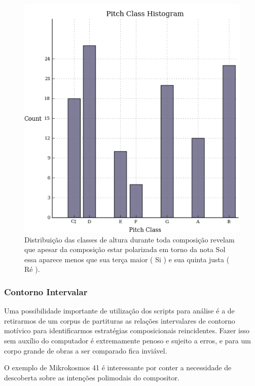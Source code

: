\documentclass[
	12pt,				%
	openright,			%
	twoside,			%
	a4paper,			%
	english,			%
	french,				%
	spanish,			%
	brazil				%
	]{abntex2}
\begin{document}
\begin{figure}[!h]
	\caption{\label{fig_grafico} Distribuição das classes de altura durante toda composição revelam que apesar da composição estar polarizada em torno da nota Sol essa aparece menos que sua terça maior ( Si ) e sua quinta justa ( Ré ). } 
	\begin{center}
	    \includegraphics[scale=0.4]{estudosM21/mikro041Pclass.png}
	\end{center}
\end{figure}



\subsubsection{Contorno Intervalar}

Uma possibilidade importante de utilização dos scripts para análise é a de retirarmos de um corpus de partituras as relações intervalares de contorno motívico para identificarmos estratégias composicionais reincidentes. Fazer isso sem auxílio do computador é extremamente penoso e sujeito a erros, e para um corpo grande de obras a ser comparado fica inviável.

O exemplo de Mikrokosmos 41 é interessante por conter a necessidade de descoberta sobre as intenções polimodais do compositor.
\end{document}
